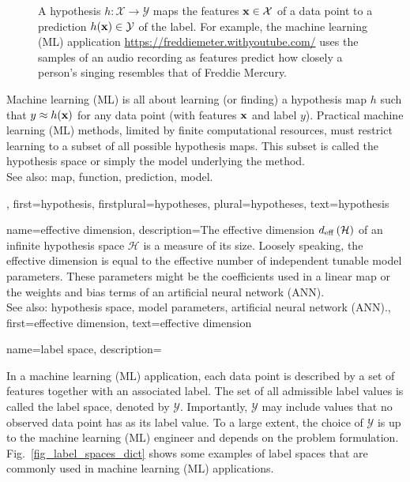 {{{\begin{figure}[htbp]
			\caption{\label{fig:hypothesis_dict} A hypothesis $h: \mathcal{X} \rightarrow \mathcal{Y}$ maps the features 
				${\bf x} \in \mathcal{X}$ of a data point to a prediction $h({\bf x}) \in \mathcal{Y}$ of the label. 
				For example, the machine learning (ML) application \url{https://freddiemeter.withyoutube.com/} uses the samples of an audio 
				recording as features predict how closely a person’s singing resembles that of Freddie Mercury.
				}
		\end{figure}
		Machine learning (ML) is all about learning (or finding) a hypothesis map $h$ 
		such that $y \approx h({\bf x})$ for any data point 
		(with features ${\bf x}$ and label $y$). Practical machine learning (ML) methods, 
		limited by finite computational resources, must restrict learning to a subset of all possible 
		hypothesis maps. This subset is called the hypothesis space or simply the model underlying 
		the method.
					\\ 
		See also: map, function, prediction, model.},
	first={hypothesis},
	firstplural={hypotheses},
	plural={hypotheses},
	text={hypothesis}  
}

{name={effective dimension},
	description={The effective dimension $d_{\rm eff} \left( \mathcal{H} \right)$ of 
		an infinite hypothesis space $\mathcal{H}$ is a measure of its size. Loosely speaking, the 
		effective dimension is equal to the effective number of independent tunable model parameters. 
		These parameters might be the coefficients used in a linear map or the 
		weights and bias terms of an artificial neural network (ANN).
					\\ 
		See also: hypothesis space, model parameters, artificial neural network (ANN).},
	first={effective dimension},
	text={effective dimension}  
}

{name={label space},
	description={
		In a machine learning (ML) application, each data point is described by a 
		set of features together with an associated label. 
		The set of all admissible label values is called the label space,
		denoted by $\mathcal{Y}$. Importantly, $\mathcal{Y}$ may include values that no 
		observed data point has as its label value. 
		To a large extent, the choice of $\mathcal{Y}$ is up to the machine learning (ML) engineer 
		and depends on the problem formulation. Fig.~\ref{fig_label_spaces_dict} shows some examples 
		of label spaces that are commonly used in machine learning (ML) applications.
		\begin{figure}[H]
		\centering
		\begin{tikzpicture}[>=Stealth, font=\small]
			

\end{tikzpicture}
\end{figure}}}}
